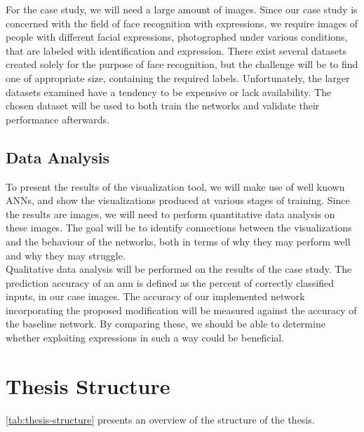 \noindent For the case study, we will need a large amount of images. Since our case study is concerned with the field of face recognition with expressions, we require images of people with different facial expressions, photographed under various conditions, that are labeled with identification and expression. There exist several datasets created solely for the purpose of face recognition, but the challenge will be to find one of appropriate size, containing the required labels. Unfortunately, the larger datasets examined have a tendency to be expensive or lack availability. The chosen dataset will be used to both train the networks and validate their performance afterwards.

\subsection{Data Analysis}

To present the results of the visualization tool, we will make use of well known ANNs, and show the visualizations produced at various stages of training. Since the results are images, we will need to perform quantitative data analysis on these images. The goal will be to identify connections between the visualizations and the behaviour of the networks, both in terms of why they may perform well and why they may struggle. \\

\noindent Qualitative data analysis will be performed on the results of the case study. The prediction accuracy of an \acrshort{ann} is defined as the percent of correctly classified inputs, in our case images. The accuracy of our implemented network incorporating the proposed modification will be measured against the accuracy of the baseline network. By comparing these, we should be able to determine whether exploiting expressions in such a way could be beneficial.

\section{Thesis Structure}

\autoref{tab:thesis-structure} presents an overview of the structure of the thesis.

